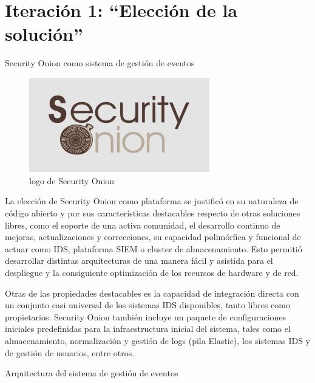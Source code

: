 \chapter{Iteración 1: “Elección de la solución”}
    \begin{section}{Security Onion como sistema de gestión de eventos}
    \begin{figure}[H]
        \centering
        \includegraphics[width=0.7\textwidth]{./iteracion_1_imagenes/figura_15_logo_sonion.png}
        \caption{logo de Security Onion\cite{sonion}}
        \label{fig:logo_sonion}
    \end{figure}
        La elección de Security Onion como plataforma se justificó en su naturaleza de código abierto y por sus características destacables respecto de otras soluciones libres, como el soporte de una activa comunidad, el desarrollo continuo de mejoras, actualizaciones y correcciones, su capacidad polimórfica y funcional de actuar como IDS, plataforma SIEM o cluster de almacenamiento. Esto permitió desarrollar distintas arquitecturas de una manera fácil y asistida para el despliegue y la consiguiente optimización de los recursos de hardware y de red. \par
        Otras de las propiedades destacables es la capacidad de integración directa con un conjunto casi universal de los sistemas IDS disponibles, tanto libres como propietarios. Security Onion también incluye un paquete de configuraciones iniciales predefinidas para la infraestructura inicial del sistema, tales como el almacenamiento, normalización y gestión de logs (pila Elastic),  los sistemas IDS y de gestión de usuarios, entre otros. \par
    \end{section}
    \begin{section}{Arquitectura del sistema de gestión de eventos}
    \end{section}
